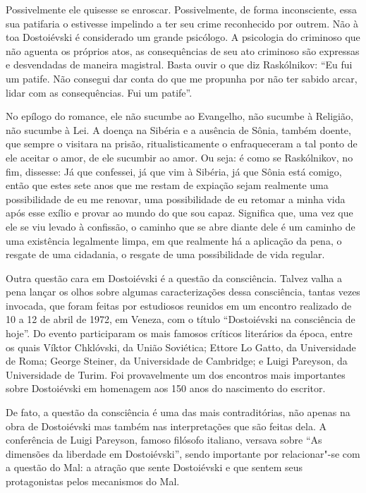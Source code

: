 {{Possivelmente ele quisesse se enroscar. Possivelmente, de forma
inconsciente, essa sua patifaria o estivesse impelindo a ter seu crime
reconhecido por outrem. Não à toa Dostoiévski é considerado um grande
psicólogo. A psicologia do criminoso que não aguenta os próprios atos,
as consequências de seu ato criminoso são expressas e desvendadas de
maneira magistral. Basta ouvir o que diz Raskólnikov: ``Eu fui um
patife. Não consegui dar conta do que me propunha por não ter sabido
arcar, lidar com as consequências. Fui um patife''.

No epílogo do romance, ele não sucumbe ao Evangelho, não sucumbe à
Religião, não sucumbe à Lei. A doença na Sibéria e a ausência de Sônia,
também doente, que sempre o visitara na prisão, ritualisticamente o
enfraqueceram a tal ponto de ele aceitar o amor, de ele sucumbir ao
amor. Ou seja: é como se Raskólnikov, no fim, dissesse: Já que
confessei, já que vim à Sibéria, já que Sônia está comigo, então que
estes sete anos que me restam de expiação sejam realmente uma
possibilidade de eu me renovar, uma possibilidade de eu retomar a minha
vida após esse exílio e provar ao mundo do que sou capaz. Significa que,
uma vez que ele se viu levado à confissão, o caminho que se abre diante
dele é um caminho de uma existência legalmente limpa, em que realmente
há a aplicação da pena, o resgate de uma cidadania, o resgate de uma
possibilidade de vida regular.

Outra questão cara em Dostoiévski é a questão da consciência. Talvez
valha a pena lançar os olhos sobre algumas caracterizações dessa
consciência, tantas vezes invocada, que foram feitas por estudiosos
reunidos em um encontro realizado de 10 a 12 de abril de 1972, em
Veneza, com o título ``Dostoiévski na consciência de hoje''. Do evento
participaram os mais famosos críticos literários da época, entre os
quais Víktor Chklóvski, da União Soviética; Ettore Lo Gatto, da
Universidade de Roma; George Steiner, da Universidade de Cambridge; e
Luigi Pareyson, da Universidade de Turim. Foi provavelmente um dos
encontros mais importantes sobre Dostoiévski em homenagem aos 150 anos
do nascimento do escritor.

De fato, a questão da consciência é uma das mais contraditórias, não
apenas na obra de Dostoiévski mas também nas interpretações que são
feitas dela. A conferência de Luigi Pareyson, famoso filósofo italiano,
versava sobre ``As dimensões da liberdade em Dostoiévski'', sendo
importante por relacionar"-se com a questão do Mal: a atração que sente
Dostoiévski e que sentem seus protagonistas pelos mecanismos do Mal.

}}

